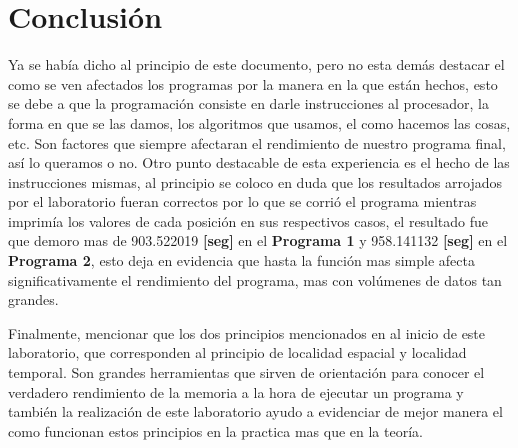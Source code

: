 \documentclass{article}
\begin{document}
    \newpage

\section{Conclusión}

    Ya se había dicho al principio de este documento, pero no esta demás destacar el como se ven afectados los programas por la manera en la que están hechos, esto se debe a que la programación consiste en darle instrucciones al procesador, la forma en que se las damos, los algoritmos que usamos, el como hacemos las cosas, etc. Son factores que siempre afectaran el rendimiento de nuestro programa final, así lo queramos o no. Otro punto destacable de esta experiencia es el hecho de las instrucciones mismas, al principio se coloco en duda que los resultados arrojados por el laboratorio fueran correctos por lo que se corrió el programa mientras imprimía los valores de cada posición en sus respectivos casos, el resultado fue que demoro mas de 903.522019 \textbf{[seg]} en el \textbf{Programa 1} y 958.141132 \textbf{[seg]} en el  \textbf{Programa 2}, esto deja en evidencia que hasta la función mas simple afecta significativamente el rendimiento del programa, mas con volúmenes de datos tan grandes.

    Finalmente, mencionar que los dos principios mencionados en al inicio de este laboratorio, que corresponden al principio de localidad espacial y localidad temporal. Son grandes herramientas que sirven de orientación para conocer el verdadero rendimiento de la memoria a la hora de ejecutar un programa y también la realización de este laboratorio ayudo a evidenciar de mejor manera el como funcionan estos principios en la practica mas que en la teoría.
\end{document}
